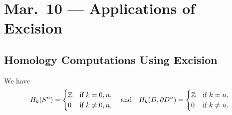\chapter{Mar.~10 --- Applications of Excision}

\section{Homology Computations Using Excision}

\begin{prop}
  We have
  \[
    H_k(S^n) =
    \begin{cases}
      \mathbb{Z} & \text{if } k = 0, n, \\
      0 & \text{if $k \ne 0, n$},
    \end{cases}
    \quad \text{and} \quad
    H_k(D, \partial D^n) =
    \begin{cases}
      \mathbb{Z} & \text{if } k = n, \\
      0 & \text{if $k \ne n$}.
    \end{cases}
  \]
\end{prop}

